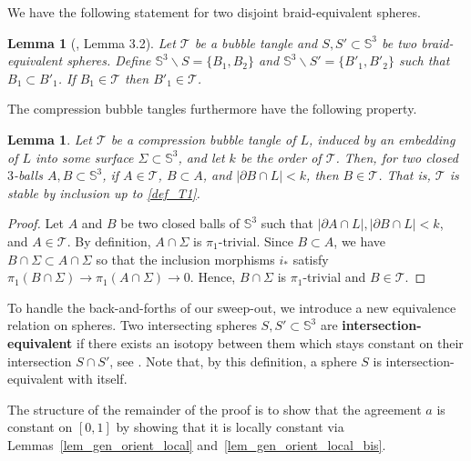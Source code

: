 \documentclass[10pt,a4paper]{amsart}
\newcommand{\Sp}{\mathbb{S}}
\newcommand{\T}{\mathcal{T}}
\newtheorem{lemma}[theorem]{Lemma}
\begin{document}
We have the following statement for two disjoint braid-equivalent spheres. 

\begin{lemma}[\cite{Lunel_spherewidth_out}, Lemma 3.2]\label{lem_braid_equi}
Let $\T$ be a bubble tangle and $S,S' \subset \Sp^3$ be two braid-equivalent spheres. Define $\Sp^3 \smallsetminus S = \{B_1,B_2\}$ and $\Sp^3 \smallsetminus S' = \{B'_1,B'_2\}$ such that $B_1 \subset B'_1$. If $B_1 \in \T$ then $B'_1 \in \T$.
\end{lemma}

The compression bubble tangles furthermore have the following property.

\begin{lemma}\label{lem_bubble_tangle_monot}
Let $\T$ be a compression bubble tangle of $L$, induced by an embedding of $L$ into some surface $\Sigma \subset \Sp^3$, and let $k$ be the order of $\T$. Then, for two closed $3$-balls $A,B \subset \Sp^3$, if $A \in \T$, $B \subset A$, and $|\partial B \cap L| < k$, then $B \in \T$. That is, $\T$ is \emph{stable by inclusion} up to \ref{def_T1}.
\end{lemma}

\begin{proof}
Let $A$ and $B$ be two closed balls of $\Sp^3$ such that $|\partial A \cap L|, |\partial B \cap L| < k$, and $A \in \T$. By definition, $A \cap \Sigma$ is $\pi_1$-trivial. Since $B \subset A $, we have $B \cap \Sigma \subset A \cap \Sigma$ so that the inclusion morphisms $i_*$ satisfy $\pi_1 (B \cap \Sigma) \rightarrow \pi_1 (A \cap \Sigma) \rightarrow 0$. Hence, $B \cap \Sigma$ is $\pi_1$-trivial and $B \in \T$.
\end{proof}

To handle the back-and-forths of our sweep-out, we introduce a new equivalence relation on spheres. Two intersecting spheres $S,S' \subset \Sp^3$ are \textbf{intersection-equivalent} if there exists an isotopy between them which stays constant on their intersection $S \cap S'$, see . Note that, by this definition, a sphere $S$ is intersection-equivalent with itself. 

The structure of the remainder of the proof is to show that the agreement $a$ is constant on $[0,1]$ by showing that it is locally constant via Lemmas~\ref{lem_gen_orient_local} and~\ref{lem_gen_orient_local_bis}.
\end{document}
